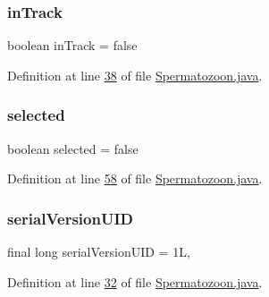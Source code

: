 \subsubsection{\texorpdfstring{in\+Track}{inTrack}}
{\footnotesize\ttfamily boolean in\+Track = false}



Definition at line \hyperlink{_spermatozoon_8java_source_l00038}{38} of file \hyperlink{_spermatozoon_8java_source}{Spermatozoon.\+java}.

\hypertarget{classdata_1_1_spermatozoon_a6c5a33868fa92607c84982d696b8e957}{}\label{classdata_1_1_spermatozoon_a6c5a33868fa92607c84982d696b8e957} 
\subsubsection{\texorpdfstring{selected}{selected}}
{\footnotesize\ttfamily boolean selected = false}



Definition at line \hyperlink{_spermatozoon_8java_source_l00058}{58} of file \hyperlink{_spermatozoon_8java_source}{Spermatozoon.\+java}.

\hypertarget{classdata_1_1_spermatozoon_a3238d314ecdee14d2966760945d00c3b}{}\label{classdata_1_1_spermatozoon_a3238d314ecdee14d2966760945d00c3b} 
\subsubsection{\texorpdfstring{serial\+Version\+U\+ID}{serialVersionUID}}
{\footnotesize\ttfamily final long serial\+Version\+U\+ID = 1L\hspace{0.3cm}{\ttfamily [static]}, {\ttfamily [private]}}



Definition at line \hyperlink{_spermatozoon_8java_source_l00032}{32} of file \hyperlink{_spermatozoon_8java_source}{Spermatozoon.\+java}.

\hypertarget{classdata_1_1_spermatozoon_ac84d85b9355bdffd37cf8632c9f72efe}{}\label{classdata_1_1_spermatozoon_ac84d85b9355bdffd37cf8632c9f72efe} 
